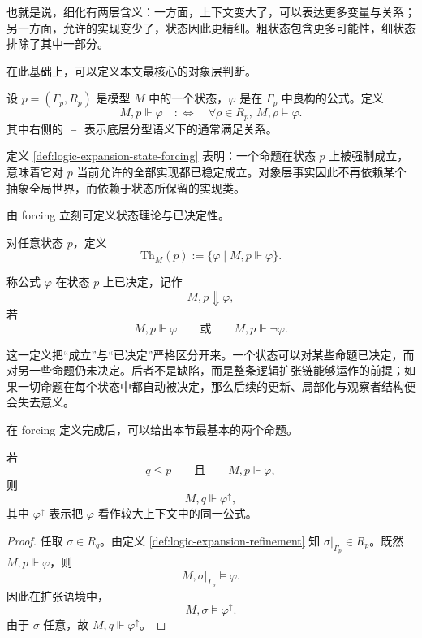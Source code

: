 也就是说，细化有两层含义：一方面，上下文变大了，可以表达更多变量与关系；另一方面，允许的实现变少了，状态因此更精细。粗状态包含更多可能性，细状态排除了其中一部分。

在此基础上，可以定义本文最核心的对象层判断。

\begin{definition}[状态 forcing]\label{def:logic-expansion-state-forcing}
设 \(p=(\Gamma_p,R_p)\) 是模型 \(M\) 中的一个状态，\(\varphi\) 是在 \(\Gamma_p\) 中良构的公式。定义
\[
M,p\Vdash \varphi
\quad:\Longleftrightarrow\quad
\forall \rho\in R_p,\ M,\rho\models \varphi.
\]
其中右侧的 \(\models\) 表示底层分型语义下的通常满足关系。
\end{definition}

定义 \ref{def:logic-expansion-state-forcing} 表明：一个命题在状态 \(p\) 上被强制成立，意味着它对 \(p\) 当前允许的全部实现都已稳定成立。对象层事实因此不再依赖某个抽象全局世界，而依赖于状态所保留的实现类。

由 forcing 立刻可定义状态理论与已决定性。

\begin{definition}[状态理论]\label{def:logic-expansion-state-theory}
对任意状态 \(p\)，定义
\[
\mathrm{Th}_M(p)
:=
\{\varphi \mid M,p\Vdash \varphi\}.
\]
\end{definition}

\begin{definition}[已决定性]\label{def:logic-expansion-decidedness}
称公式 \(\varphi\) 在状态 \(p\) 上已决定，记作
\[
M,p\Downarrow \varphi,
\]
若
\[
M,p\Vdash \varphi
\qquad\text{或}\qquad
M,p\Vdash \neg\varphi.
\]
\end{definition}

这一定义把“成立”与“已决定”严格区分开来。一个状态可以对某些命题已决定，而对另一些命题仍未决定。后者不是缺陷，而是整条逻辑扩张链能够运作的前提；如果一切命题在每个状态中都自动被决定，那么后续的更新、局部化与观察者结构便会失去意义。

在 forcing 定义完成后，可以给出本节最基本的两个命题。

\begin{proposition}\label{prop:logic-expansion-forcing-persistence}
若
\[
q\le p
\qquad\text{且}\qquad
M,p\Vdash \varphi,
\]
则
\[
M,q\Vdash \varphi^\uparrow,
\]
其中 \(\varphi^\uparrow\) 表示把 \(\varphi\) 看作较大上下文中的同一公式。
\end{proposition}

\begin{proof}
任取 \(\sigma\in R_q\)。由定义 \ref{def:logic-expansion-refinement} 知 \(\sigma|_{\Gamma_p}\in R_p\)。既然 \(M,p\Vdash \varphi\)，则
\[
M,\sigma|_{\Gamma_p}\models \varphi.
\]
因此在扩张语境中，
\[
M,\sigma\models \varphi^\uparrow.
\]
由于 \(\sigma\) 任意，故 \(M,q\Vdash \varphi^\uparrow\)。
\end{proof}

